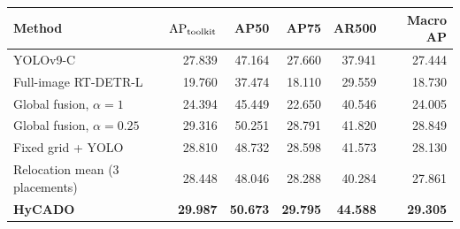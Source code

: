 \begin{tabular}{lrrrrr}
\toprule
Method & $\mathrm{AP}_{\mathrm{toolkit}}$ & AP50 & AP75 & AR500 & Macro AP\\
\midrule
YOLOv9-C & 27.839 & 47.164 & 27.660 & 37.941 & 27.444\\
Full-image RT-DETR-L & 19.760 & 37.474 & 18.110 & 29.559 & 18.730\\
Global fusion, $\alpha=1$ & 24.394 & 45.449 & 22.650 & 40.546 & 24.005\\
Global fusion, $\alpha=0.25$ & 29.316 & 50.251 & 28.791 & 41.820 & 28.849\\
Fixed grid + YOLO & 28.810 & 48.732 & 28.598 & 41.573 & 28.130\\
Relocation mean (3 placements) & 28.448 & 48.046 & 28.288 & 40.284 & 27.861\\
\textbf{HyCADO} & \textbf{29.987} & \textbf{50.673} & \textbf{29.795} & \textbf{44.588} & \textbf{29.305}\\
\bottomrule
\end{tabular}
